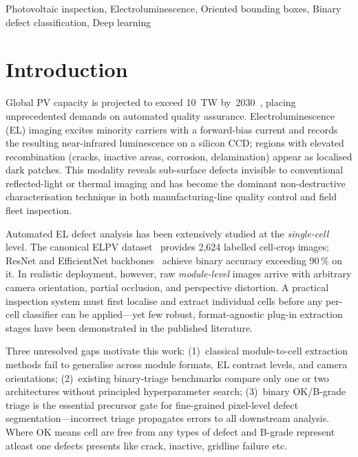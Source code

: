 \documentclass[conference]{IEEEtran}
\begin{document}
\begin{IEEEkeywords}
Photovoltaic inspection, Electroluminescence, Oriented bounding boxes, Binary defect classification, Deep learning
\end{IEEEkeywords}

\section{Introduction}

Global PV capacity is projected to exceed 10~TW by~2030~\cite{iea2023}, placing unprecedented demands on automated quality assurance. Electroluminescence (EL) imaging excites minority carriers with a forward-bias current and records the resulting near-infrared luminescence on a silicon CCD; regions with elevated recombination (cracks, inactive areas, corrosion, delamination) appear as localised dark patches. This modality reveals sub-surface defects invisible to conventional reflected-light or thermal imaging and has become the dominant non-destructive characterisation technique in both manufacturing-line quality control and field fleet inspection.

Automated EL defect analysis has been extensively studied at the \textit{single-cell} level. The canonical ELPV dataset~\cite{deitsch2019} provides 2{,}624 labelled cell-crop images; ResNet and EfficientNet backbones~\cite{he2016,tan2019} achieve binary accuracy exceeding 90\,\% on it. In realistic deployment, however, raw \textit{module-level} images arrive with arbitrary camera orientation, partial occlusion, and perspective distortion. A practical inspection system must first localise and extract individual cells before any per-cell classifier can be applied---yet few robust, format-agnostic plug-in extraction stages have been demonstrated in the published literature.

Three unresolved gaps motivate this work: (1)~classical module-to-cell extraction methods fail to generalise across module formats, EL contrast levels, and camera orientations; (2)~existing binary-triage benchmarks compare only one or two architectures without principled hyperparameter search; (3)~binary OK/B-grade triage is the essential precursor gate for fine-grained pixel-level defect segmentation---incorrect triage propagates errors to all downstream analysis. Where OK means cell are free from any types of defect and B-grade represent atleast one defects presents like crack, inactive, gridline failure etc.
\end{document}
